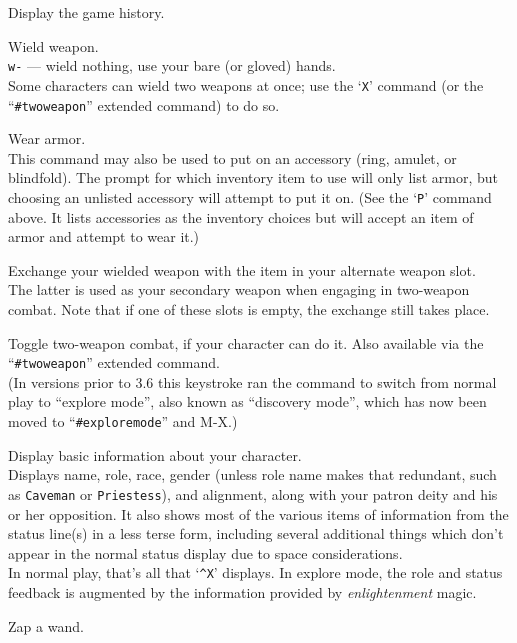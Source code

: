 \item[\tb{V}]
Display the game history.
\item[\tb{w}]
Wield weapon.\\
{\tt w-} --- wield nothing, use your bare (or gloved) hands.\\
Some characters can wield two weapons at once; use the `{\tt X}' command
(or the ``{\tt \#twoweapon}'' extended command) to do so.
\item[\tb{W}]
Wear armor.\\
This command may also be used to put on an accessory (ring, amulet, or
blindfold).  The prompt for which inventory item to use will only list
armor, but choosing an unlisted accessory will attempt to put it on.
(See the `{\tt P}' command above.  It lists accessories as the inventory
choices but will accept an item of armor and attempt to wear it.)
\item[\tb{x}]
Exchange your wielded weapon with the item in your alternate weapon slot.\\
The latter is used as your secondary weapon when engaging in
two-weapon combat.  Note that if one of these slots is empty,
the exchange still takes place.
\item[\tb{X}]
Toggle two-weapon combat, if your character can do it.  Also available
via the ``{\tt \#twoweapon}'' extended command.\\
(In versions prior to 3.6 this keystroke ran the command to switch from normal
play to ``explore mode'', also known as ``discovery mode'', which has now
been moved to ``{\tt \#exploremode}'' and M-X.)
\item[\tb{\^{}X}]
Display basic information about your character.\\
Displays name, role, race, gender (unless role name makes that
redundant, such as {\tt Caveman} or {\tt Priestess}), and alignment,
along with your patron deity and his or her opposition.  It also
shows most of the various items of information from the status line(s)
in a less terse form, including several additional things which don't
appear in the normal status display due to space considerations.\\
In normal play, that's all that `{\tt \^{}X}' displays.
In explore mode, the role and status feedback is augmented by the
information provided by {\it enlightenment\/} magic.
\item[\tb{z}]
Zap a wand.\\
